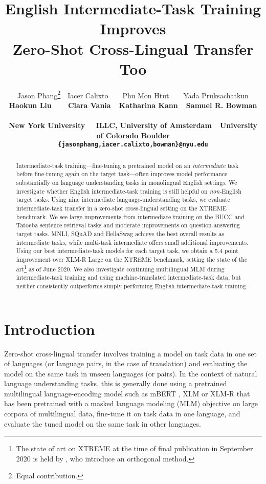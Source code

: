 \documentclass[11pt,a4paper]{article}
\title{English Intermediate-Task Training Improves\\ Zero-Shot Cross-Lingual Transfer Too}
\author{Jason Phang\thanks{Equal contribution.}\ \ Iacer Calixto\footnotemark[1]\ \ ~~Phu Mon Htut\ \ ~~Yada Pruksachatkun\\ \bf Haokun Liu\ \ ~~Clara Vania\ \ Katharina Kann\ \ Samuel R. Bowman\\\\
New York University \ \ 
ILLC, University of Amsterdam\ \
University of Colorado Boulder\\
\texttt{\{jasonphang,iacer.calixto,bowman\}@nyu.edu}
}
\date{}
\begin{document}
\maketitle
\begin{abstract}
Intermediate-task training---fine-tuning a pretrained model on an \textit{intermediate} task before fine-tuning again on the target task---often improves model performance substantially on language understanding tasks in monolingual English settings.
We investigate whether English intermediate-task training is still helpful on \textit{non-}English target tasks.
Using nine intermediate language-understanding tasks,
we evaluate intermediate-task transfer in a zero-shot cross-lingual setting on the XTREME benchmark.
We see large improvements from intermediate training on the BUCC and Tatoeba sentence retrieval tasks and moderate improvements on question-answering target tasks.
MNLI, SQuAD and HellaSwag achieve the best overall results as intermediate tasks, while multi-task intermediate offers small additional improvements.
Using our best intermediate-task models for each target task, we obtain a 5.4 point improvement over \mbox{XLM-R} Large on the XTREME benchmark, setting the state of the art\footnote{The state of art on XTREME at the time of final publication in September 2020 is held by \citet{fang2020filter}, who introduce an orthogonal method.} as of June 2020.
We also investigate continuing multilingual MLM during intermediate-task training and using machine-translated intermediate-task data, but neither consistently outperforms simply performing English intermediate-task training.
\end{abstract}



\section{Introduction}



Zero-shot cross-lingual transfer involves training a model on task data in one set of languages (or language pairs, in the case of translation) and evaluating the model on the same task in unseen languages (or pairs).
In the context of natural language understanding tasks, this is generally done using a pretrained multilingual language-encoding model such as mBERT \citep{devlin2019bert}, XLM \citep{lample2019cross} or XLM-R \citep{conneau2019xlmr}
that has been pretrained with a masked language modeling (MLM) objective on large corpora of multilingual data, 
fine-tune it on task data in one language, and evaluate the tuned model on the same task in other languages.
\end{document}
